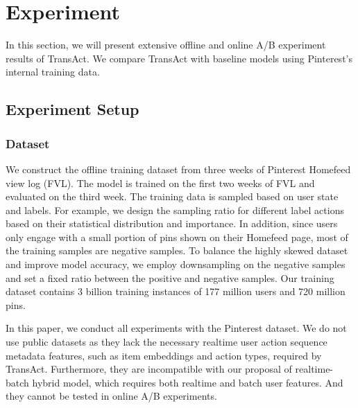\section{Experiment}
\label{sec:exp}
In this section, we will present extensive offline and online A/B experiment results of TransAct. We compare TransAct with baseline models using Pinterest's internal training data. 
\subsection{Experiment Setup}
\subsubsection{Dataset}
We construct the offline training dataset from three weeks of Pinterest Homefeed view log (FVL). The model is trained on the first two weeks of FVL and evaluated on the third week. The training data is sampled based on user state and labels. 
For example, we design the sampling ratio for different label actions based on their statistical distribution and importance. 
In addition, since users only engage with a small portion of pins shown on their Homefeed page, most of the training samples are negative samples. To balance the highly skewed dataset and improve model accuracy,
we employ downsampling on the negative samples and set a fixed ratio between the positive and negative samples.
Our training dataset contains 3 billion training instances of 177 million users and 720 million pins.

In this paper, we conduct all experiments with the Pinterest dataset. We do not use public datasets as they lack the necessary realtime user action sequence metadata features, such as item embeddings and action types, required by TransAct.  
Furthermore, they are incompatible with our proposal of realtime-batch hybrid model, which requires both realtime and batch user features. 
And they cannot be tested in online A/B experiments. 

